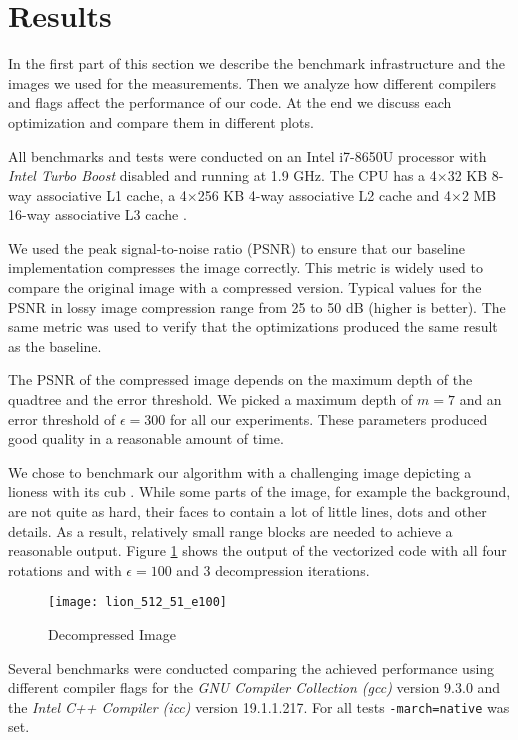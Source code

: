 \section{Results}\label{sec:exp}

In the first part of this section we describe the benchmark infrastructure and the
images we used for the measurements. Then we analyze how different compilers and flags  
affect the performance of our code. At the end we discuss each optimization and compare
them in different plots.

 All benchmarks and tests were conducted on an Intel
i7-8650U processor with \textit{Intel Turbo Boost} disabled and running at 1.9
GHz. The CPU has a 4$\times$32 KB 8-way associative L1 cache, a 4$\times$256 KB
4-way associative L2 cache and 4$\times$2 MB 16-way associative L3 cache
\cite{intel-opt-manual}. 

We used the peak signal-to-noise ratio (PSNR) to ensure that our baseline implementation
compresses the image correctly. This metric is widely used to compare the original image with
a compressed version. Typical values for the PSNR in lossy image compression range from 25 to 
50 dB (higher is better). The same metric was used to verify that the optimizations 
produced the same result as the baseline.

The PSNR of the compressed image depends on the maximum depth of the quadtree and the error
threshold. We picked a maximum depth of $m=7$ and an error threshold of $\epsilon=300$ for
all our experiments. These parameters produced good quality in a reasonable amount of time.

We chose to benchmark our algorithm with a challenging image depicting a lioness
with its cub \cite{lions}. While some parts of the image, for example the
background, are not quite as hard, their faces to contain a lot of little lines,
dots and other details. As a result, relatively small range blocks are needed to
achieve a reasonable output. Figure \ref{fig:lions} shows the output of the
vectorized code with all four rotations and with $\epsilon=100$ and 3
decompression iterations.

\begin{figure}[H]
  \centering
  \texttt{[image: lion\_512\_51\_e100]}
  \caption{Decompressed Image}
  \label{fig:lions}
\end{figure}

 Several benchmarks were conducted comparing the achieved
performance using different compiler flags for the \textit{GNU Compiler
  Collection (gcc)} version 9.3.0 and the \textit{Intel C++ Compiler (icc)}
version 19.1.1.217. For all tests \texttt{-march=native} was set.

